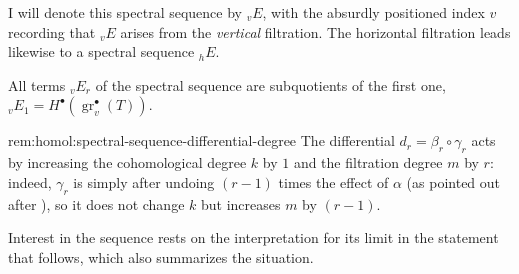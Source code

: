 I will denote this spectral sequence by ${}_vE$, with the absurdly
positioned index $v$ recording that ${}_vE$ arises from the
\emph{vertical} filtration. The horizontal filtration leads likewise
to a spectral sequence ${}_hE$.

All terms ${}_vE_r$ of the spectral sequence are subquotients of the
first one, ${}_vE_1 = H^\bullet(\operatorname{gr}_v^\bullet(T))$.

\begin{rem}{}{rem:homol:spectral-sequence-differential-degree}
  The differential $d_r = \beta_r \circ \gamma_r$ acts by increasing
  the cohomological degree $k$ by $1$ and the filtration degree $m$ by
  $r$: indeed, $\gamma_r$ is simply
  after undoing $(r-1)$ times the effect of $\alpha$ (as pointed out
  after ), so it does not change $k$ but
  increases $m$ by $(r-1)$.
\end{rem}

Interest in the sequence rests on the interpretation for its limit in
the statement that follows, which also summarizes the situation.

